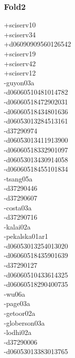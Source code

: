\begin{multicols}{3}
\subsubsection*{Fold2}
+sciserv10\\
+sciserv34\\
+d06090909560126542\\
+sciserv19\\
+sciserv42\\
+sciserv12\\
-guyon03a\\
-d06060510481014782\\
-d06060518472902031\\
-d06060518434801636\\
-d06053013284513161\\
-d37290974\\
-d06053013411913900\\
-d06060518332901097\\
-d06053013430914058\\
-d06060518455101834\\
-tsang05a\\
-d37290446\\
-d37290607\\
-costa03a\\
-d37290716\\
-kalai02a\\
-pekalska01ar1\\
-d06053013254013020\\
-d06060518435901639\\
-d37290127\\
-d06060510433614325\\
-d06060518290400735\\
-wu06a\\
-page03a\\
-getoor02a\\
-globerson03a\\
-lodhi02a\\
-d37290006\\
-d06053013383013765\\

\end{multicols}
